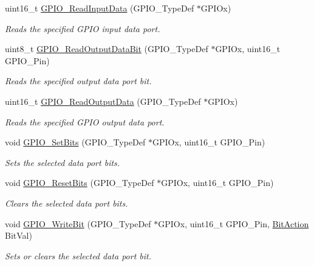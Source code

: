 \begin{DoxyCompactItemize}
uint16\+\_\+t \mbox{\hyperlink{group___g_p_i_o_ga139a33adc8409288e9f193bbebb5a0f7}{G\+P\+I\+O\+\_\+\+Read\+Input\+Data}} (G\+P\+I\+O\+\_\+\+Type\+Def $\ast$G\+P\+I\+Ox)
\begin{DoxyCompactList}\small\item\em Reads the specified G\+P\+IO input data port. \end{DoxyCompactList}\item 
uint8\+\_\+t \mbox{\hyperlink{group___g_p_i_o_ga138270f8695b105b7c6ed405792919c1}{G\+P\+I\+O\+\_\+\+Read\+Output\+Data\+Bit}} (G\+P\+I\+O\+\_\+\+Type\+Def $\ast$G\+P\+I\+Ox, uint16\+\_\+t G\+P\+I\+O\+\_\+\+Pin)
\begin{DoxyCompactList}\small\item\em Reads the specified output data port bit. \end{DoxyCompactList}\item 
uint16\+\_\+t \mbox{\hyperlink{group___g_p_i_o_gaf8938a34280b7dc3e39872a7c17bb323}{G\+P\+I\+O\+\_\+\+Read\+Output\+Data}} (G\+P\+I\+O\+\_\+\+Type\+Def $\ast$G\+P\+I\+Ox)
\begin{DoxyCompactList}\small\item\em Reads the specified G\+P\+IO output data port. \end{DoxyCompactList}\item 
void \mbox{\hyperlink{group___g_p_i_o_ga9e1352eed7c6620e18af2d86f6b6ff8e}{G\+P\+I\+O\+\_\+\+Set\+Bits}} (G\+P\+I\+O\+\_\+\+Type\+Def $\ast$G\+P\+I\+Ox, uint16\+\_\+t G\+P\+I\+O\+\_\+\+Pin)
\begin{DoxyCompactList}\small\item\em Sets the selected data port bits. \end{DoxyCompactList}\item 
void \mbox{\hyperlink{group___g_p_i_o_ga6fcd35b207a66608dd2c9d7de9247dc8}{G\+P\+I\+O\+\_\+\+Reset\+Bits}} (G\+P\+I\+O\+\_\+\+Type\+Def $\ast$G\+P\+I\+Ox, uint16\+\_\+t G\+P\+I\+O\+\_\+\+Pin)
\begin{DoxyCompactList}\small\item\em Clears the selected data port bits. \end{DoxyCompactList}\item 
void \mbox{\hyperlink{group___g_p_i_o_ga8f7b237fd744d9f7456fbe0da47a9b80}{G\+P\+I\+O\+\_\+\+Write\+Bit}} (G\+P\+I\+O\+\_\+\+Type\+Def $\ast$G\+P\+I\+Ox, uint16\+\_\+t G\+P\+I\+O\+\_\+\+Pin, \mbox{\hyperlink{group___g_p_i_o_ga176130b21c0e719121470a6042d4cf19}{Bit\+Action}} Bit\+Val)
\begin{DoxyCompactList}\small\item\em Sets or clears the selected data port bit. \end{DoxyCompactList}\item 

\end{DoxyCompactItemize}
